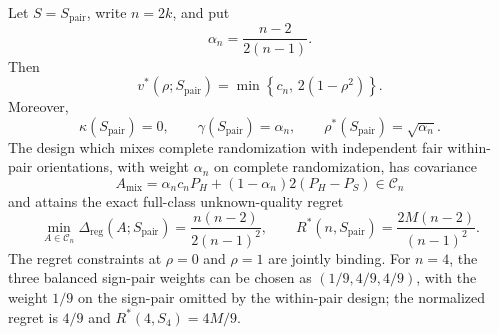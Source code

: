 Let \(S=S_{\mathrm{pair}}\), write \(n=2k\), and put
\[
 \alpha_n=\frac{n-2}{2(n-1)}.
\]
Then
\[
 v^*(\rho;S_{\mathrm{pair}})
 =\min\left\{c_n,\,2(1-\rho^2)\right\}.
\]
Moreover,
\[
 \kappa(S_{\mathrm{pair}})=0,
 \qquad
 \gamma(S_{\mathrm{pair}})=\alpha_n,
 \qquad
 \rho^*(S_{\mathrm{pair}})=\sqrt{\alpha_n}.
\]
The design which mixes complete randomization with independent fair within-pair orientations, with weight \(\alpha_n\) on complete randomization, has covariance
\[
 A_{\mathrm{mix}}
 =\alpha_n c_nP_H+(1-\alpha_n)2(P_H-P_S)\in\mathcal C_n
\]
and attains the exact full-class unknown-quality regret
\[
 \min_{A\in\mathcal C_n}\Delta_{\mathrm{reg}}(A;S_{\mathrm{pair}})
 =\frac{n(n-2)}{2(n-1)^2},
 \qquad
 R^*(n,S_{\mathrm{pair}})=\frac{2M(n-2)}{(n-1)^2}.
\]
The regret constraints at \(\rho=0\) and \(\rho=1\) are jointly binding.  For \(n=4\), the three balanced sign-pair weights can be chosen as \((1/9,4/9,4/9)\), with the weight \(1/9\) on the sign-pair omitted by the within-pair design; the normalized regret is \(4/9\) and \(R^*(4,S_4)=4M/9\).